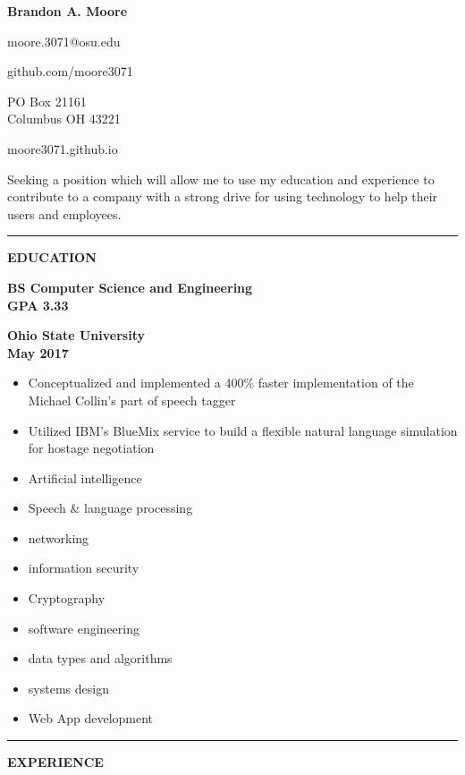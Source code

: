 \documentclass[letterpaper,10pt]{article}
\newcommand{\topic}[1]{\vspace{2mm} \rule[.5em]{10mm}{.2pt} {\large \bfseries #1} \xrfill[.5em]{.2pt} \newline \vspace{-2mm}}
\newcommand{\fullentry}[3] { \parbox[t]{.6\textwidth}{\large \bfseries #1} \hfill \parbox[t]{.4\textwidth}{\bfseries \raggedleft #2 \\ #3} \vspace{.5mm} \newline}
\newcommand{\contact}[1]{\parbox{.18\textwidth}{\centering #1}}
\begin{document}
	\begin{center} \huge \bfseries
		Brandon A. Moore
	\end{center}
	\contact{moore.3071@osu.edu} \hfill \contact{github.com/moore3071} \hfill \contact{PO Box 21161\\Columbus OH 43221} \hfill \contact{moore3071.github.io}


	\vspace{5mm}

	 Seeking a position which will allow me to use my education and experience to contribute to a company with a strong drive for using technology to help their users and employees.

	\vspace{3mm}

	\topic{EDUCATION}

		\fullentry{BS Computer Science and Engineering\\GPA 3.33}{Ohio State University}{May 2017}
			\vspace{-7mm}
			\begin{itemize}
				\item Conceptualized and implemented a 400\% faster implementation of the Michael Collin's part of speech tagger
				\item Utilized IBM's BlueMix service to build a flexible natural language simulation for hostage negotiation
			\end{itemize}
			\begin{multicols}{3}
				\begin{itemize}
					\setlength\itemsep{.1mm}
					\item Artificial intelligence
					\item Speech \& language processing
					\item networking
					\item information security
					\item Cryptography
					\item software engineering
					\item data types and algorithms
					\item systems design
					\item Web App development
				\end{itemize}
			\end{multicols}

	\topic{EXPERIENCE}
\end{document}
